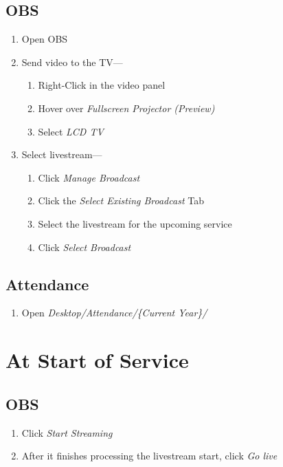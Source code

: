 \documentclass[12pt]{article}
\begin{document}
    \subsection{OBS}
    \begin{enumerate}
        \item Open OBS
        \item Send video to the TV---
        \begin{enumerate}
            \item Right-Click in the video panel
            \item Hover over \emph{Fullscreen Projector (Preview)}
            \item Select \emph{LCD TV}
        \end{enumerate}
        \item Select livestream---
        \begin{enumerate}
            \item Click \emph{Manage Broadcast}
            \item Click the \emph{Select Existing Broadcast} Tab
            \item Select the livestream for the upcoming service
            \item Click \emph{Select Broadcast}
        \end{enumerate}
    \end{enumerate}

    \subsection{Attendance}
    \begin{enumerate}
        \item Open \emph{Desktop/Attendance/\{Current Year\}/}
    \end{enumerate}


\section{At Start of Service}

    \subsection{OBS}
    \begin{enumerate}
        \item Click \emph{Start Streaming}
        \item After it finishes processing the livestream start, click \emph{Go live}
    \end{enumerate}
\end{document}
